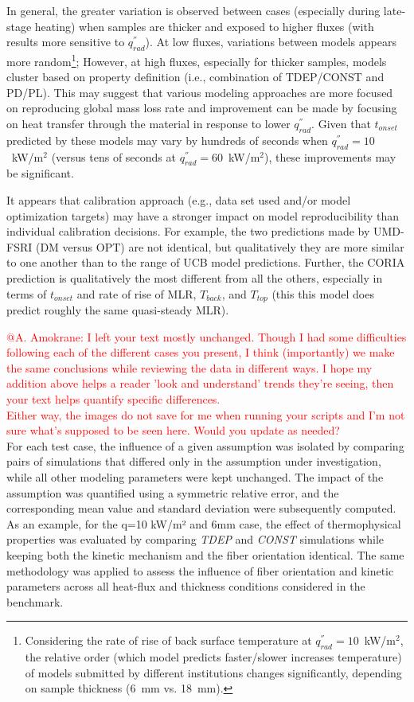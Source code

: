 \documentclass{article}
\begin{document}
In general, the greater variation is observed between cases (especially during late-stage heating) when samples are thicker and exposed to higher fluxes (with results more sensitive to $q^{''}_{rad}$). At low fluxes, variations between models appears more random\footnote{Considering the rate of rise of back surface temperature at $q^{''}_{rad}=10$~kW/m$^2$, the relative order (which model predicts faster/slower increases temperature) of models submitted by different institutions changes significantly, depending on sample thickness (6~mm vs. 18~mm).}; However, at high fluxes, especially for thicker samples, models cluster based on property definition (i.e., combination of TDEP/CONST and PD/PL). This may suggest that various modeling approaches are more focused on reproducing global mass loss rate and improvement can be made by focusing on heat transfer through the material in response to lower $q^{''}_{rad}$. Given that $t_{onset}$ predicted by these models may vary by hundreds of seconds when $q^{''}_{rad}=10$~kW/m$^2$ (versus tens of seconds at $q^{''}_{rad}=60$~kW/m$^2$), these improvements may be significant.
	
It appears that calibration approach (e.g., data set used and/or model optimization targets) may have a stronger impact on model reproducibility than individual calibration decisions. For example, the two predictions made by UMD-FSRI (DM versus OPT) are not identical, but qualitatively they are more similar to one another than to the range of UCB model predictions. Further, the CORIA prediction is qualitatively the most different from all the others, especially in terms of $t_{onset}$ and rate of rise of MLR, $T_{back}$, and $T_{top}$ (this this model does predict roughly the same quasi-steady MLR). 

\textcolor{red}{@A. Amokrane: I left your text mostly unchanged. Though I had some difficulties following each of the different cases you present, I think (importantly) we make the same conclusions while reviewing the data in different ways. I hope my addition above helps a reader 'look and understand' trends they're seeing, then your text helps quantify specific differences.\\
Either way, the images do not save for me when running your scripts and I'm not sure what's supposed to be seen here. Would you update as needed?}\\

For each test case, the influence of a given assumption was isolated by comparing pairs of simulations that differed only in the assumption under investigation, while all other modeling parameters were kept unchanged. The impact of the assumption was quantified using a symmetric relative error, and the corresponding mean value and standard deviation were subsequently computed. As an example, for the q=10 kW/m² and 6mm case, the effect of thermophysical properties was evaluated by comparing \textit{TDEP} and \textit{CONST} simulations while keeping both the kinetic mechanism and the fiber orientation identical. The same methodology was applied to assess the influence of fiber orientation and kinetic parameters across all heat-flux and thickness conditions considered in the benchmark.
\end{document}
